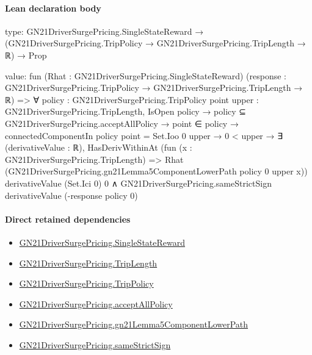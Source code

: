\documentclass[10pt]{article}
\begin{document}
\paragraph{Lean declaration body}
\begin{ReviewVerbatim}
type:
GN21DriverSurgePricing.SingleStateReward →
  (GN21DriverSurgePricing.TripPolicy → GN21DriverSurgePricing.TripLength → ℝ) → Prop

value:
fun (Rhat : GN21DriverSurgePricing.SingleStateReward)
    (response : GN21DriverSurgePricing.TripPolicy → GN21DriverSurgePricing.TripLength → ℝ) =>
  ∀ {policy : GN21DriverSurgePricing.TripPolicy} {point upper : GN21DriverSurgePricing.TripLength},
    IsOpen policy →
      policy ⊆ GN21DriverSurgePricing.acceptAllPolicy →
        point ∈ policy →
          connectedComponentIn policy point = Set.Ioo 0 upper →
            0 < upper →
              ∃ (derivativeValue : ℝ),
                HasDerivWithinAt
                    (fun (x : GN21DriverSurgePricing.TripLength) =>
                      Rhat (GN21DriverSurgePricing.gn21Lemma5ComponentLowerPath policy 0 upper x))
                    derivativeValue (Set.Ici 0) 0 ∧
                  GN21DriverSurgePricing.sameStrictSign derivativeValue (-response policy 0)
\end{ReviewVerbatim}

\paragraph{Direct retained dependencies}
\begin{itemize}\raggedright
\item \hyperlink{governing-declaration-f7708ce48623a5e0}{GN21\allowbreak{}Driver\allowbreak{}Surge\allowbreak{}Pricing.\allowbreak{}Single\allowbreak{}State\allowbreak{}Reward}
\item \hyperlink{governing-declaration-a616c143f22cf2bc}{GN21\allowbreak{}Driver\allowbreak{}Surge\allowbreak{}Pricing.\allowbreak{}Trip\allowbreak{}Length}
\item \hyperlink{governing-declaration-4312ad4cb899871f}{GN21\allowbreak{}Driver\allowbreak{}Surge\allowbreak{}Pricing.\allowbreak{}Trip\allowbreak{}Policy}
\item \hyperlink{governing-declaration-e94c9281d4f4b12d}{GN21\allowbreak{}Driver\allowbreak{}Surge\allowbreak{}Pricing.\allowbreak{}accept\allowbreak{}All\allowbreak{}Policy}
\item \hyperlink{governing-declaration-1b48432894ee2dd4}{GN21\allowbreak{}Driver\allowbreak{}Surge\allowbreak{}Pricing.\allowbreak{}gn21\allowbreak{}Lemma5\allowbreak{}Component\allowbreak{}Lower\allowbreak{}Path}
\item \hyperlink{governing-declaration-867d0251c5f9e2dc}{GN21\allowbreak{}Driver\allowbreak{}Surge\allowbreak{}Pricing.\allowbreak{}same\allowbreak{}Strict\allowbreak{}Sign}
\end{itemize}
\hypertarget{governing-declaration-d12b637e898ed436}{}
\end{document}
